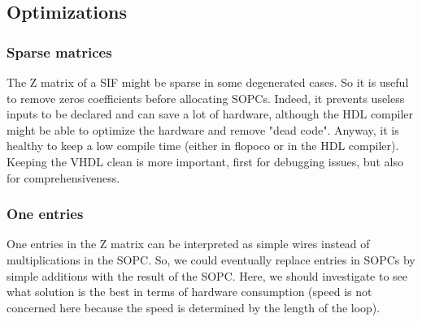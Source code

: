 \subsection{Optimizations}
	\subsubsection{Sparse matrices}
		The Z matrix of a SIF might be sparse in some degenerated cases.
		So it is useful to remove zeros coefficients before allocating SOPCs.
		Indeed, it prevents useless inputs to be declared and can save a lot of hardware,
		although the HDL compiler might be able to optimize the hardware and remove "dead code".
		Anyway, it is healthy to keep a low compile time (either in flopoco or in the HDL compiler).
		Keeping the VHDL clean is more important, first for debugging issues, but also for comprehensiveness.
	\subsubsection{One entries}
		One entries in the Z matrix can be interpreted as simple wires instead of multiplications in the SOPC.
		So, we could eventually replace entries in SOPCs by simple additions with the result of the SOPC.
		Here, we should investigate to see what solution is the best in terms of hardware consumption
		(speed is not concerned here because the speed is determined by the length of the loop).


